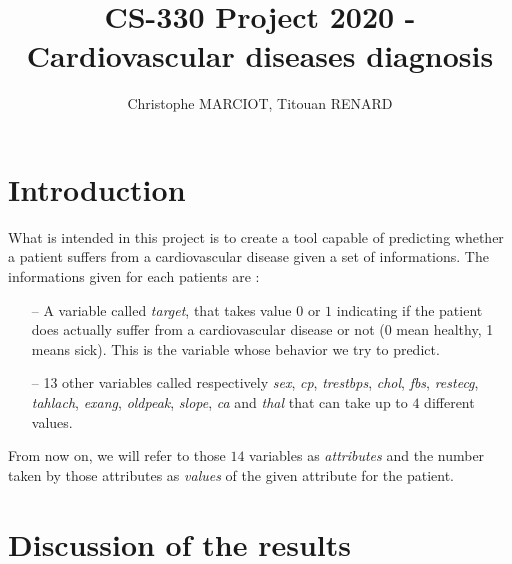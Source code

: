 \documentclass[8pt]{extarticle}
\title{CS-330 Project 2020 - Cardiovascular diseases diagnosis}   %
\author{Christophe MARCIOT, Titouan RENARD}         %
\begin{document}
\maketitle

\section{Introduction}
What is intended in this project is to create a tool capable of predicting whether a patient suffers from a cardiovascular disease given a set of informations.
The informations given for each patients are :
	\begin{itemize}[topsep=0pt,itemsep=0pt,partopsep=0pt, parsep=0pt]
		\item[--] A variable called \emph{target}, that takes value $0$ or $1$ indicating if the patient does actually suffer from a cardiovascular disease or not (0 mean healthy, 1 means sick). This is the variable whose behavior we try to predict.
		\item[--] 13 other variables called respectively \emph{sex}, \emph{cp}, \emph{trestbps}, \emph{chol}, \emph{fbs}, \emph{restecg}, \emph{tahlach}, \emph {exang}, \emph{oldpeak}, \emph{slope}, \emph{ca} and \emph{thal} that can take up to $4$ different values.
	\end{itemize}
From now on, we will refer to those $14$  variables as \emph{attributes} and the number taken by those attributes as \emph{values} of the given attribute for the patient.

\section{Discussion of the results}
\end{document}
